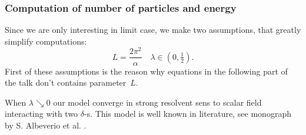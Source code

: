 \documentclass[10pt,t]{beamer}
\begin{document}
\begin{frame}
  \frametitle{Computation of number of particles and energy}


  Since we are only interesting in limit case, we make two assumptions,
  that greatly simplify computations:
  \begin{equation}
    \label{eq:Energia-i-liczba-czastek-dla-modelu-ETC-34}
    L = \frac{ 2 \pi^{ 2 } }{ \alpha } \quad
    \lambda \in \left( 0, \tfrac{ 1 }{ 2 } \right).
  \end{equation}
  First of these assumptions is the reason why equations in the following
  part of the talk \alert{don't} contains parameter~$L$.

  When $\lambda \searrow 0$ our model converge in strong resolvent sens to scalar field
  interacting with two $\delta$-s. This model is well known in literature, see
  monograph by S. Albeverio et al. \parencite{}.



\end{frame}
\end{document}
